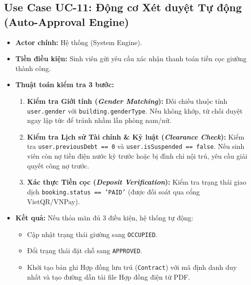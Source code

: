 \subsection{Use Case UC-11: Động cơ Xét duyệt Tự động (Auto-Approval Engine)}
\begin{itemize}
    \item \textbf{Actor chính:} Hệ thống (System Engine).
    \item \textbf{Tiền điều kiện:} Sinh viên gửi yêu cầu xác nhận thanh toán tiền cọc giường thành công.
    \item \textbf{Thuật toán kiểm tra 3 bước:}
    \begin{enumerate}
        \item \textbf{Kiểm tra Giới tính (\textit{Gender Matching}):} Đối chiếu thuộc tính \texttt{user.gender} với \texttt{building.genderType}. Nếu không khớp, từ chối duyệt ngay lập tức để tránh nhầm lẫn phòng nam/nữ.
        \item \textbf{Kiểm tra Lịch sử Tài chính \& Kỷ luật (\textit{Clearance Check}):} Kiểm tra \texttt{user.previousDebt == 0} và \texttt{user.isSuspended == false}. Nếu sinh viên còn nợ tiền điện nước kỳ trước hoặc bị đình chỉ nội trú, yêu cầu giải quyết công nợ trước.
        \item \textbf{Xác thực Tiền cọc (\textit{Deposit Verification}):} Kiểm tra trạng thái giao dịch \texttt{booking.status == 'PAID'} (được đối soát qua cổng VietQR/VNPay).
    \end{enumerate}
    \item \textbf{Kết quả:} Nếu thỏa mãn đủ 3 điều kiện, hệ thống tự động:
    \begin{itemize}
        \item Cập nhật trạng thái giường sang \texttt{OCCUPIED}.
        \item Đổi trạng thái đặt chỗ sang \texttt{APPROVED}.
        \item Khởi tạo bản ghi Hợp đồng lưu trú (\texttt{Contract}) với mã định danh duy nhất và tạo đường dẫn tải file Hợp đồng điện tử PDF.
    \end{itemize}
\end{itemize}

